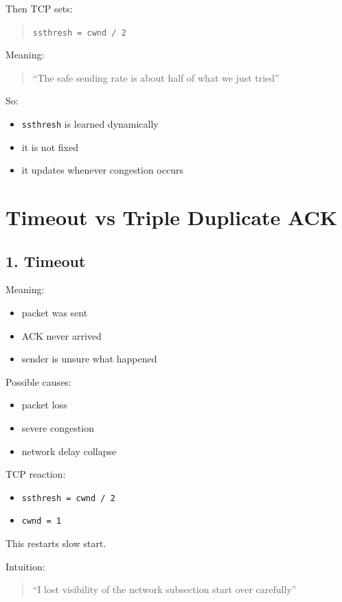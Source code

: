 Then TCP sets:

\begin{quote}
\texttt{ssthresh = cwnd / 2}
\end{quote}

Meaning:

\begin{quote}
“The safe sending rate is about half of what we just tried”
\end{quote}

So:
\begin{itemize}
    \item \texttt{ssthresh} is learned dynamically
    \item it is not fixed
    \item it updates whenever congestion occurs
\end{itemize}

\section{Timeout vs Triple Duplicate ACK}

\subsection{1. Timeout}

Meaning:
\begin{itemize}
    \item packet was sent
    \item ACK never arrived
    \item sender is unsure what happened
\end{itemize}

Possible causes:
\begin{itemize}
    \item packet loss
    \item severe congestion
    \item network delay collapse
\end{itemize}

TCP reaction:
\begin{itemize}
    \item \texttt{ssthresh = cwnd / 2}
    \item \texttt{cwnd = 1}
\end{itemize}

This restarts slow start.

Intuition:

\begin{quote}
“I lost visibility of the network subsection start over carefully”
\end{quote}

